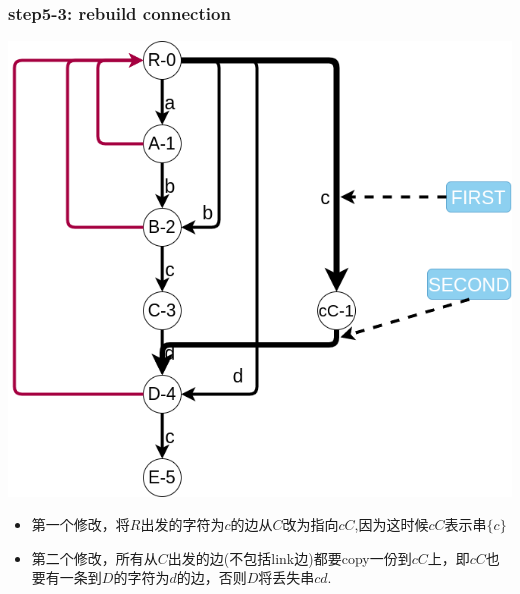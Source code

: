 \documentclass{article}
\begin{document}
\subsubsection{step5-3: rebuild connection}
\includegraphics[scale=0.5]{step53.png} \par
\begin{itemize}
	\item 第一个修改，将$R$出发的字符为$c$的边从$C$改为指向$cC$,因为这时候$cC$表示串$\{c\}$
	\item 第二个修改，所有从$C$出发的边(不包括link边)都要copy一份到$cC$上，即$cC$也要有一条到$D$的字符为$d$的边，否则$D$将丢失串$cd$.
\end{itemize}
\end{document}
